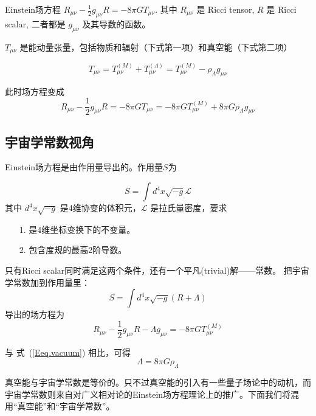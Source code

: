 \documentclass[12pt]{ctexart}
\newcommand{\refeq}[1]{式~(\ref{#1})}
\begin{document}
Einstein场方程 $R_{\mu\nu} - \frac{1}{2} g_{\mu\nu} R = -8\pi G T_{\mu\nu}$.
其中 $R_{\mu\nu}$ 是 Ricci tensor,  $R$ 是 Ricci scalar, 二者都是  $g_{\mu\nu}$ 及其导数的函数。

$T_{\mu\nu}$ 是能动量张量，包括物质和辐射（下式第一项）和真空能（下式第二项）

\begin{equation}
    T_{\mu\nu} = T_{\mu\nu}^{(M)} + T_{\mu\nu}^{(\Lambda)} = T_{\mu\nu}^{(M)} - \rho_\Lambda g_{\mu\nu}
\end{equation}

此时场方程变成 
\begin{equation} \label{Eeq.vacuum}
    R_{\mu\nu} - \frac{1}{2} g_{\mu\nu} R = -8\pi G T_{\mu\nu} =  -8\pi G T_{\mu\nu}^{(M)} +  8\pi G \rho_\Lambda g_{\mu\nu}
\end{equation}

\subsection{宇宙学常数视角}
Einstein场方程是由作用量导出的。作用量$S$为

\begin{equation}
    S = \int d^4 x \sqrt{-g} \mathcal{L} 
\end{equation}
其中 $d^4 x \sqrt{-g}$ 是4维协变的体积元，$\mathcal{L}$ 是拉氏量密度，要求 
\begin{itemize}
    \item[1.] 是4维坐标变换下的不变量。
    \item[2.] 包含度规的最高2阶导数。
\end{itemize}

只有Ricci scalar同时满足这两个条件，还有一个平凡(trivial)解——常数。 把宇宙学常数加到作用量里：
\begin{equation}
    S = \int d^4 x \sqrt{-g} \left( R  + \Lambda \right) 
\end{equation}
导出的场方程为
\begin{equation}
    R_{\mu\nu} - \frac{1}{2} g_{\mu\nu} R - \Lambda g_{\mu\nu} =  -8\pi G T_{\mu\nu}^{(M)} 
\end{equation}

与 \refeq{Eeq.vacuum} 相比，可得
\begin{equation}
    \Lambda = 8\pi G \rho_\Lambda 
\end{equation}

真空能与宇宙学常数是等价的。只不过真空能的引入有一些量子场论中的动机，而宇宙学常数则来自对广义相对论的Einstein场方程理论上的推广。下面我们将混用“真空能”和“宇宙学常数”。
\end{document}
